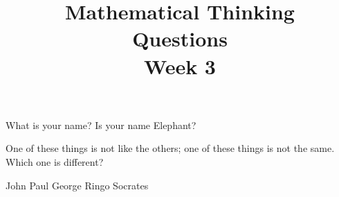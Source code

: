 \documentclass[12pt]{exam}
\title{\begin{framed}
    \textbf{Mathematical Thinking}\\Questions\\Week 3
\end{framed}}
\date{}
\begin{document}
\maketitle
\pointsinrightmargin
\begin{questions}
\question[1] What is your name?
\question[1] Is your name Elephant?
\question
One of these things is not like the others; one of these things is not
the same. Which one is different?
\begin{choices}
\choice John
\choice Paul
\choice George
\choice Ringo
\choice Socrates
\end{choices}
\end{questions}
\end{document}

